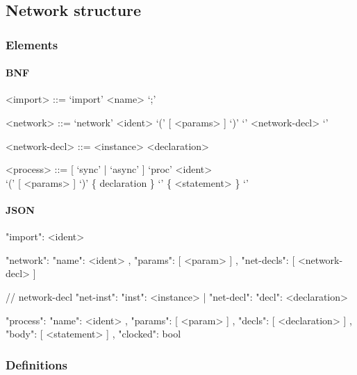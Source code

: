 \documentclass{article}
\begin{document}
\subsection{Network structure}

\subsubsection{Elements}
\paragraph{BNF}
\begin{grammar}
  <import> ::= `import' <name> `;'

  <network> ::= `network' <ident> `(' [ <params> ] `)' `{' <network-decl> `}'

  <network-decl> ::= <instance>
  \alt <declaration>

  <process> ::= [ `sync' | `async' ] `proc' <ident> \\ `(' [
  <params> ] `)' \{ declaration \} `{' \{ <statement> \} `}'
\end{grammar}

\paragraph{JSON}
\begin{jsoncode}
 {"import": <ident>}

 {"network": { "name": <ident>
             , "params": [ <param> ]
             , "net-decls": [ <network-decl> ]
             }
 }

// network-decl
{ "net-inst": { "inst": <instance> }
| "net-decl": { "decl": <declaration> }
}

 {"process": { "name": <ident>
             , "params": [ <param> ]
             , "decls": [ <declaration> ]
             , "body": [ <statement> ]
             , "clocked": bool
             }
}
\end{jsoncode}

\subsubsection{Definitions}
\end{document}
